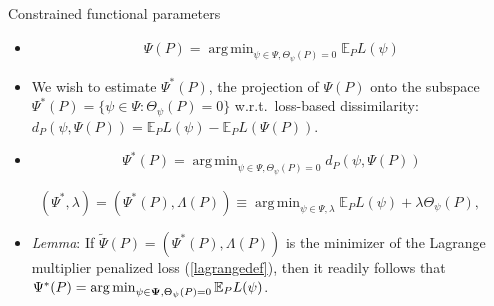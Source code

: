 \documentclass[12pt,t,handout]{beamer}
\newcommand{\E}{\mathbb{E}}
\DeclareMathOperator*{\argmin}{arg\,min}
\begin{document}
\begin{frame}[c]{Constrained functional parameters}

\begin{center}
\begin{itemize}
  \itemsep12pt
  \item $$\Psi(P) = \argmin_{\psi \in \Psi, \Theta_{\psi}(P) = 0} \E_PL(\psi)$$
  \item We wish to estimate $\Psi^*(P)$, the projection of $\Psi(P)$ onto the
    subspace $\Psi^*(P) = \{\psi \in \Psi: \Theta_{\psi}(P) = 0\}$
    w.r.t.~loss-based dissimilarity: $d_{P}(\psi, \Psi(P)) = \E_PL(\psi) -
    \E_PL(\Psi(P))$.
  \item $$ \Psi^*(P) = \argmin_{\psi \in \Psi, \Theta_{\psi}(P) = 0} d_{P}(\psi,
    \Psi(P))$$
\end{itemize}

\begin{equation}\label{lagrangedef}
  (\Psi^*, \lambda) = (\Psi^*(P), \Lambda(P)) \equiv \argmin_{\psi \in \Psi,
    \lambda} \E_PL(\psi) + \lambda \Theta_{\psi}(P),
\end{equation}

\begin{itemize}
  \item \textit{Lemma}: If $\widetilde{\Psi}(P) = (\Psi^*(P), \Lambda(P))$ is
    the minimizer of the Lagrange multiplier penalized loss (\ref{lagrangedef}),
    then it readily follows that $\Psi^*(P) = \argmin_{\psi \in {\bf \Psi},
      \Theta_{\psi}(P) = 0} \E_{P}L(\psi)$.
\end{itemize}

\end{center}

\note{
}

\end{frame}

\end{document}
